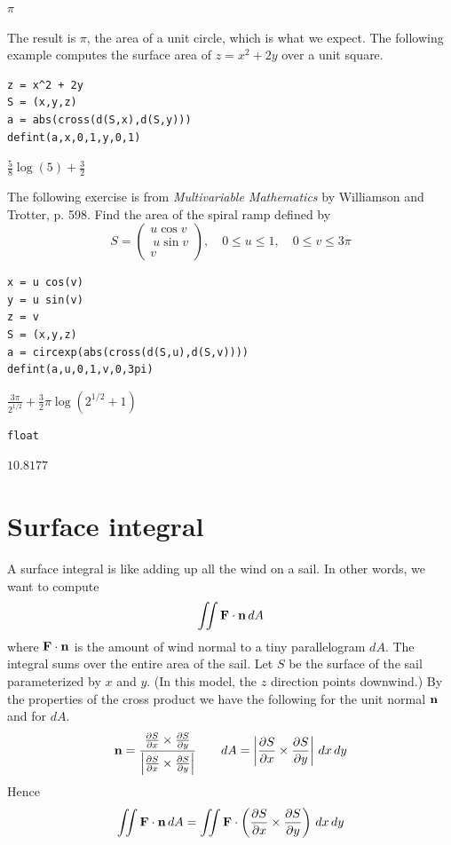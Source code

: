 \documentclass[12pt]{article}
\begin{document}
$\displaystyle \pi$

\bigskip
The result is $\pi$, the area of a unit circle, which is what we expect.
The following example computes the surface area of $z=x^2+2y$ over
a unit square.

{\color{blue}
\begin{verbatim}
z = x^2 + 2y
S = (x,y,z)
a = abs(cross(d(S,x),d(S,y)))
defint(a,x,0,1,y,0,1)
\end{verbatim}
}

$\displaystyle \tfrac{5}{8}\log(5)+\tfrac{3}{2}$

\bigskip
The following exercise is from
{\it Multivariable Mathematics} by Williamson and Trotter, p. 598.
Find the area of the spiral ramp defined by
\begin{equation*}
S=\begin{pmatrix}u\cos v\\\ u\sin v\\ v\end{pmatrix},\quad 0\le u\le1,\quad 0\le v\le3\pi
\end{equation*}

{\color{blue}
\begin{verbatim}
x = u cos(v)
y = u sin(v)
z = v
S = (x,y,z)
a = circexp(abs(cross(d(S,u),d(S,v))))
defint(a,u,0,1,v,0,3pi)
\end{verbatim}
}

$\displaystyle \frac{3\pi}{2^{1/2}}+\tfrac{3}{2}\pi\log\left(2^{1/2}+1\right)$

{\color{blue}
\begin{verbatim}
float
\end{verbatim}
}

$\displaystyle 10.8177$

\newpage

\section{Surface integral}

A surface integral is like adding up all the wind on a sail.
In other words, we want to compute
$$\int\!\!\!\int{\bf F\cdot n}\,dA$$
where ${\bf F\cdot n}$ is the amount of wind normal to a tiny parallelogram $dA$.
The integral sums over the entire area of the sail.
Let $S$ be the surface of the sail parameterized by $x$ and $y$.
(In this model, the $z$ direction points downwind.)
By the properties of the cross product we have the following for the unit normal $\bf n$
and for $dA$.
$${\bf n}=\frac{{\frac{\partial S}{\partial x}\times\frac{\partial S}{\partial y}}}
{{\left|\frac{\partial S}{\partial x}\times\frac{\partial S}{\partial y}\right|}}\qquad
dA=\left|\frac{\partial S}{\partial x}\times\frac{\partial S}{\partial y}\right|\,dx\,dy$$
Hence
$$\int\!\!\!\int{\bf F\cdot n}\,dA=\int\!\!\!\int{\bf F}\cdot
\left({\frac{\partial S}{\partial x}\times\frac{\partial S}{\partial y}}\right)\,dx\,dy$$
\end{document}

